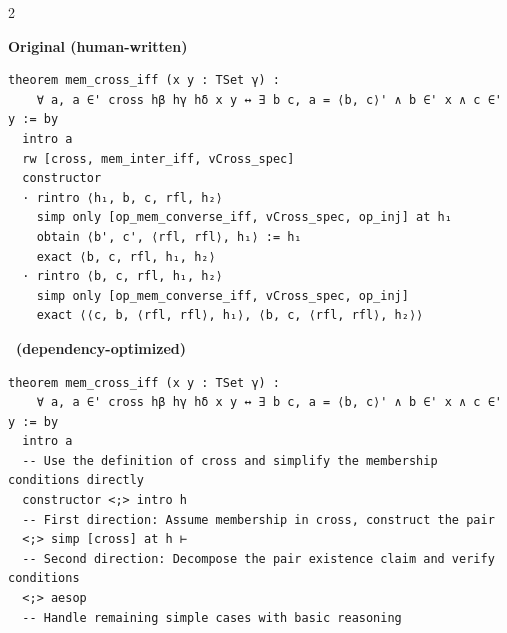 {
    \setlength{\columnsep}{0.2cm}
    
    \begin{paracol}{2}
{
\textbf{Original (human-written)}
\begin{lstlisting}[basicstyle=\tiny\ttfamily]
theorem mem_cross_iff (x y : TSet γ) :
    ∀ a, a ∈' cross hβ hγ hδ x y ↔ ∃ b c, a = ⟨b, c⟩' ∧ b ∈' x ∧ c ∈' y := by
  intro a
  rw [cross, mem_inter_iff, vCross_spec]
  constructor
  · rintro ⟨h₁, b, c, rfl, h₂⟩
    simp only [op_mem_converse_iff, vCross_spec, op_inj] at h₁
    obtain ⟨b', c', ⟨rfl, rfl⟩, h₁⟩ := h₁
    exact ⟨b, c, rfl, h₁, h₂⟩
  · rintro ⟨b, c, rfl, h₁, h₂⟩
    simp only [op_mem_converse_iff, vCross_spec, op_inj]
    exact ⟨⟨c, b, ⟨rfl, rfl⟩, h₁⟩, ⟨b, c, ⟨rfl, rfl⟩, h₂⟩⟩
\end{lstlisting}
\switchcolumn
\textbf{\ImProver \ (dependency-optimized)}
\begin{lstlisting}[basicstyle=\tiny\ttfamily]
theorem mem_cross_iff (x y : TSet γ) :
    ∀ a, a ∈' cross hβ hγ hδ x y ↔ ∃ b c, a = ⟨b, c⟩' ∧ b ∈' x ∧ c ∈' y := by
  intro a
  -- Use the definition of cross and simplify the membership conditions directly
  constructor <;> intro h
  -- First direction: Assume membership in cross, construct the pair
  <;> simp [cross] at h ⊢
  -- Second direction: Decompose the pair existence claim and verify conditions
  <;> aesop
  -- Handle remaining simple cases with basic reasoning
\end{lstlisting}
}
\end{paracol}
\label{fig:improver2-dep-mem-cross}
}



